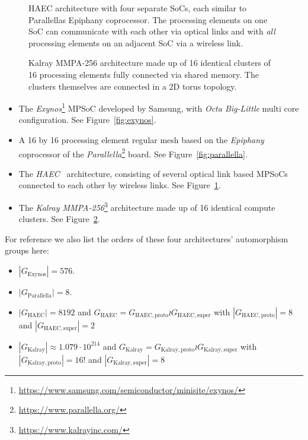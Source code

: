 \begin{figure}
  \centering
  \caption{HAEC architecture with four separate SoCs, each similar to
           Parallellas Epiphany coprocessor. The processing elements on one
           SoC can communicate with each other via optical links and with
           \textit{all} processing elements on an adjacent SoC via a wireless
           link.}
  \label{fig:haec}
\end{figure}

\begin{figure}
  \centering
  \caption{Kalray MMPA-256 architecture made up of 16 identical clusters of 16
           processing elements fully connected via shared memory. The clusters
           themselves are connected in a 2D torus topology.}
  \label{fig:kalray}
\end{figure}

\begin{itemize}
\item The
\textit{Exynos}\footnote{\hyperlink{https://www.samsung.com/semiconductor/minisite/exynos/}{https://www.samsung.com/semiconductor/minisite/exynos/}}
MPSoC developed by Samsung, with \textit{Octa Big-Little} multi core
configuration. See Figure~\ref{fig:exynos}.

\item A 16 by 16 processing element regular mesh based on the
\textit{Epiphany} \cite{Olofsson16} coprocessor of the
\textit{Parallella}\footnote{\hyperlink{https://www.parallella.org/}{https://www.parallella.org/}}
board. See Figure~\ref{fig:parallella}.

\item The \textit{HAEC}~\cite{HAEC} architecture, consisting of several optical
link based MPSoCs connected to each other by wireless links. See
Figure~\ref{fig:haec}.

\item The \textit{Kalray
MMPA-256}\footnote{\hyperlink{https://www.kalrayinc.com/}{https://www.kalrayinc.com/}}
architecture made up of 16 identical compute clusters. See
Figure~\ref{fig:kalray}.
\end{itemize}
%
For reference we also list the orders of these four architectures' automorphism
groups here:
%
\begin{itemize}
\item $|G_{\mathrm{Exynos}}| = 576$.

\item $|G_{\mathrm{Parallella}}| = 8$.

\item $|G_{\mathrm{HAEC}}| = 8192$ and $G_{\mathrm{HAEC}} =
G_{\mathrm{HAEC,proto}} \wr G_{\mathrm{HAEC,super}}$ with
$|G_{\mathrm{HAEC,proto}}| = 8$ and $|G_{\mathrm{HAEC,super}}| = 2$

\item $|G_{\mathrm{Kalray}}| \approx 1.079 \cdot 10^{214}$ and
$G_{\mathrm{Kalray}} = G_{\mathrm{Kalray,proto}} \wr G_{\mathrm{Kalray,super}}$
with $|G_{\mathrm{Kalray,proto}}| = 16!$ and $|G_{\mathrm{Kalray,super}}| = 8$
\end{itemize}

